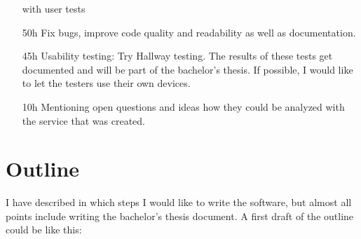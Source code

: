 \documentclass[a4paper]{scrartcl}
\begin{document}
\begin{itemize}
               with user tests
    \item[50h] Fix bugs, improve code quality and readability as well
               as documentation.
    \item[45h] Usability testing: Try Hallway testing. The results
               of these tests get documented and will be part of the
               bachelor's thesis. If possible, I would like
               to let the testers use their own devices.
    \item[10h] Mentioning open questions and ideas how they could be
               analyzed with the service that was created.
\end{itemize}

\section{Outline}
I have described in which steps I would like to write the software, 
but almost all points include writing the bachelor's thesis document.
A first draft of the outline could be like this:
\end{document}

